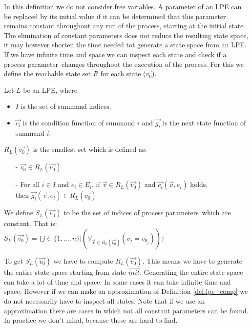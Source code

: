 \index{}\documentclass[a4paper,10pt]{article}
\theoremstyle{plain}
\theoremstyle{definition}
\newcommand{\ovr}{\overrightarrow}
\newcommand{\pp}{process parameter}
\newcommand{\pps}{process parameters}
\begin{document}
In this definition we do not consider free variables.
A parameter of an LPE can be replaced by its initial value if it can be determined that this parameter remains constant throughout any run of the process, starting at the initial state. The elimination of constant parameters does not reduce the resulting state space, it may however shorten the time needed tot generate a state space from an LPE. \\
If we have infinite time and space we can inspect each state and check if a \pp\ changes throughout the execution of the process. For this we define the reachable state set $R$ for each state ($\ovr{v_0}$). 
\begin{defn}\label{def:lpe} Let $L$ be an LPE, where\begin{itemize}
\item $I$ is the set of summand indices.
\item $\ovr{c_i}$ is the condition function of summand $i$ and $\ovr{g_i}$ is the next state function of summand $i$.
\end{itemize}

$R_L(\ovr{v_0})$ is the smallest set which is defined as:
  \begin{itemize}
    \item[-] $\ovr{v_0} \in R_L(\ovr{v_0})$
    \item[-] For all $i \in I$ and $e_i \in E_i$, if $\ovr{v} \in R_L(\ovr{v_0})$ and $\ovr{c_i}(\ovr{v}, e_i)$ holds, \\ then $\ovr{g_i}(\ovr{v}, e_i) \in R_L(\ovr{v_0})$ \\
   \end{itemize}
\end{defn}

\begin{defn}\label{def:lpe_comp} We define $S_L(\ovr{v_0})$ to be the set of indices of \pps\ which are constant. That is:\\

$S_L(\ovr{v_0}) = \lbrace j \in  \lbrace 1, \ldots, n \rbrace \vert (\forall_{\ovr{v} \in R_L(\ovr{v_0})}( v_j = v_{0_j})) \rbrace $
\end{defn}

To get $S_L(\ovr{v_0})$ we have to compute $R_L(\ovr{v_0})$. This means we have to generate the entire state space starting from state $\ovr{init}$. Generating the entire state space can take a lot of time and space. In some cases it can take infinite time and space. However if we can make an approximation of Definition \ref{def:lpe_comp} we do not necessarily have to inspect all states. Note that if we use an approximation there are cases in which not all constant parameters can be found. In practice we don't mind, because these are hard to find.
\end{document}
